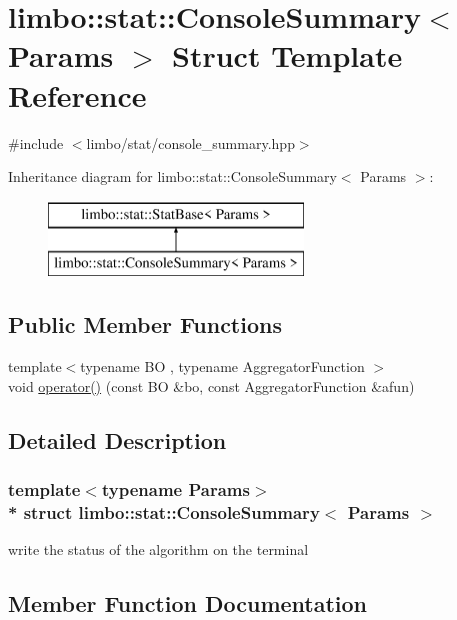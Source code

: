 \hypertarget{structlimbo_1_1stat_1_1_console_summary}{}\section{limbo\+:\+:stat\+:\+:Console\+Summary$<$ Params $>$ Struct Template Reference}
\label{structlimbo_1_1stat_1_1_console_summary}


{\ttfamily \#include $<$limbo/stat/console\+\_\+summary.\+hpp$>$}

Inheritance diagram for limbo\+:\+:stat\+:\+:Console\+Summary$<$ Params $>$\+:\begin{figure}[H]
\begin{center}
\leavevmode
\includegraphics[height=2.000000cm]{structlimbo_1_1stat_1_1_console_summary}
\end{center}
\end{figure}
\subsection*{Public Member Functions}
\begin{DoxyCompactItemize}
\item 
{\footnotesize template$<$typename BO , typename Aggregator\+Function $>$ }\\void \hyperlink{structlimbo_1_1stat_1_1_console_summary_a7c65e2f910881abe72e4bb181d357f4a}{operator()} (const BO \&bo, const Aggregator\+Function \&afun)
\end{DoxyCompactItemize}


\subsection{Detailed Description}
\subsubsection*{template$<$typename Params$>$\\*
struct limbo\+::stat\+::\+Console\+Summary$<$ Params $>$}

write the status of the algorithm on the terminal 

\subsection{Member Function Documentation}
